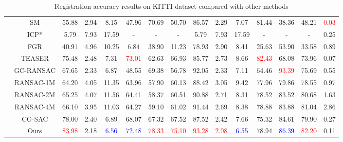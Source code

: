 \begin{table*}[!ht]
\begin{tabular}{cc|cccccc|cccccc|c}
		
		\multirow{10}{0.04cm}{\rotatebox{90}{traditional}} & SM \cite{leordeanu2005spectral} & 55.88 & 2.94 & 8.15 & 47.96 & 70.69 & 50.70 & 86.57 & 2.29 & 7.07 & 81.44 & 38.36 & 48.21 & \textcolor{Red}{0.03}\\
		& ICP* \cite{besl1992method} & 5.79 & 7.93 & 17.59 & - & - & - & 5.79 & 7.93 & 17.59 & - & - & - & 0.25\\
		& FGR \cite{zhou2016fast} & 40.91 & 4.96 & 10.25 & 6.84 & 38.90 & 11.23 & 78.93 & 2.90 & 8.41 & 25.63 & 53.90 & 33.58 & 0.89 \\
		& TEASER \cite{yang2020teaser} & 75.48 & 2.48 & 7.31 & \textcolor{Red}{73.01} & 62.63 & 66.93 & 85.77 & 2.73 & 8.66 & \textcolor{Red}{82.43} & 68.08 & 73.96 & 0.07\\
		& GC-RANSAC \cite{barath2018graph} & 67.65 & 2.33 & 6.87 & 48.55 & 69.38 & 56.78 & 92.05 & 2.33 & 7.11 & 64.46 & \textcolor{Red}{93.39} & 75.69 & 0.55\\
		& RANSAC-1M \cite{fischler1981random} & 64.20 & 4.05 & 11.35 & 63.96 & 57.90 & 60.13 & 88.42 & 3.05 & 9.42 & 77.96 & 79.86 & 78.55 & 0.97 \\
		& RANSAC-2M \cite{fischler1981random} & 65.25 & 4.07 & 11.56 & 64.41 & 58.37 & 60.51 & 90.88 & 2.71 & 8.31 & 78.52 & 83.52 & 80.68 & 1.63 \\
		& RANSAC-4M \cite{fischler1981random} & 66.10 & 3.95 & 11.03 & 64.27 & 59.10 & 61.02 & 91.44 & 2.69 & 8.38 & 78.88 & 83.88 & 81.04  & 2.86 \\
		& CG-SAC \cite{quan2020compatibility} & 78.00 & 2.40 & 6.89 & 68.07 & 67.32 & 67.52 & 87.52 & 2.42 & 7.66 & 75.32 & 84.61 & 79.90 & 0.27 \\
		& Ours & \textcolor{Red}{83.98} & 2.18 & \textcolor{Blue}{6.56} & \textcolor{Blue}{72.48} & \textcolor{Red}{78.33} & \textcolor{Red}{75.10} & \textcolor{Red}{93.28} & \textcolor{Red}{2.08} & \textcolor{Blue}{6.55} & 78.94 & \textcolor{Blue}{86.39} & \textcolor{Red}{82.20} & 0.11\\ \hline
		
	\end{tabular}
	\caption{Registration accuracy results on KITTI dataset compared with other methods}
	\vspace{-3mm}
	\label{tab:eval-table}
\end{table*}